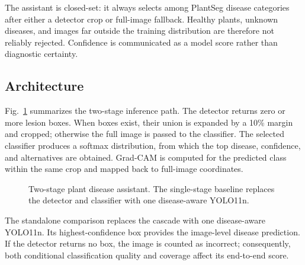 \documentclass[conference]{IEEEtran}
\begin{document}
The assistant is closed-set: it always selects among PlantSeg disease categories after either a
detector crop or full-image fallback. Healthy plants, unknown diseases, and images far outside the
training distribution are therefore not reliably rejected. Confidence is communicated as a model
score rather than diagnostic certainty.

\subsection{Architecture}

Fig.~\ref{fig:architecture} summarizes the two-stage inference path. The detector returns zero or
more lesion boxes. When boxes exist, their union is expanded by a 10\% margin and cropped; otherwise
the full image is passed to the classifier. The selected classifier produces a softmax distribution,
from which the top disease, confidence, and alternatives are obtained. Grad-CAM is computed for the
predicted class within the same crop and mapped back to full-image coordinates.

\begin{figure}[t]
\centering
{}
\caption{Two-stage plant disease assistant. The single-stage baseline replaces the detector and
classifier with one disease-aware YOLO11n.}
\label{fig:architecture}
\end{figure}

The standalone comparison replaces the cascade with one disease-aware YOLO11n. Its
highest-confidence box provides the image-level disease prediction. If the detector returns no box,
the image is counted as incorrect; consequently, both conditional classification quality and
coverage affect its end-to-end score.
\end{document}

